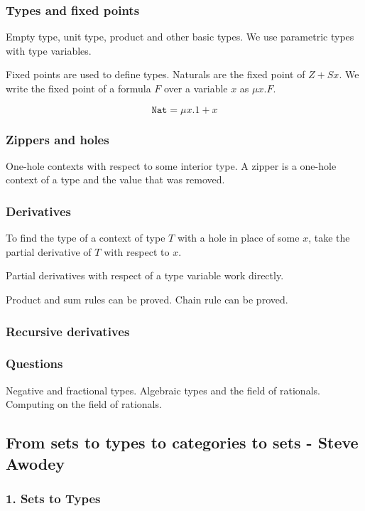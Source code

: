 \documentclass[11pt]{article}
\begin{document}
\subsubsection*{Types and fixed points}
\label{sec-1-6-1}
Empty type, unit type, product and other basic types.
We use parametric types with type variables.

Fixed points are used to define types. Naturals are
the fixed point of $Z + S x$. We write the fixed point
of a formula $F$ over a variable $x$ as $\mu x.F$.

\[
\mathtt{Nat} = \mu x. 1 + x
\]

\subsubsection*{Zippers and holes}
\label{sec-1-6-2}
One-hole contexts with respect to some interior type. A zipper is a
one-hole context of a type and the value that was removed.

\subsubsection*{Derivatives}
\label{sec-1-6-3}
To find the type of a context of type $T$ with a hole in place of some
$x$, take the partial derivative of $T$ with respect to $x$.

Partial derivatives with respect of a type variable work directly.

Product and sum rules can be proved. Chain rule can be proved.

\subsubsection*{Recursive derivatives}
\label{sec-1-6-4}

\subsubsection*{Questions}
\label{sec-1-6-5}
Negative and fractional types. Algebraic types and the field of rationals.
Computing on the field of rationals.
\subsection*{From sets to types to categories to sets - Steve Awodey}
\label{sec-1-7}
\subsubsection*{1. Sets to Types}
\label{sec-1-7-1}
\end{document}
